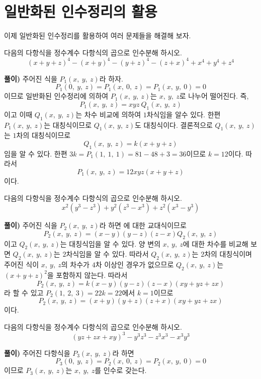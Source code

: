 \documentclass[a4paper]{article}
\begin{document}
\section{일반화된 인수정리의 활용}
이제 일반화된 인수정리를 활용하여 여러 문제들을 해결해 보자.
\vspace{1em}
\begin{problem}
 다음의 다항식을 정수계수 다항식의 곱으로 인수분해 하시오.
 \[
 (x+y+z)^4 - (x+y)^4 - (y+z)^4 - (z+x)^4 +x^4 + y^4 + z^4
 \]
\end{problem}

\textbf{풀이)} 주어진 식을 $P_{1}(x,\:y,\:z)$라 하자. 
\[
P_{1}(0, \:y,\:z) = P_{1}(x,\:0, \:z) = P_{1}(x,\:y,\:0) =0
\]
이므로 일반화된 인수정리에 의하여 $P_{1}(x,\:y,\:z)$는 $x,\:y,\:z$로 나누어 떨어진다. 즉, 
\[
P_{1}(x,\:y,\:z) = x y z \: Q_{1}(x,\: y,\:z)
\]
이고 이때 $Q_{1}(x,\: y,\:z)$는 차수 비교에 의하여 $1$차식임을 알수 있다. 한편 $P_{1}(x,\:y,\:z)$는 대칭식이므로 $Q_{1}(x,\: y,\:z)$도 대칭식이다. 결론적으로 $Q_{1}(x,\: y,\:z)$는 $1$차의 대칭식이므로 
\[
Q_{1}(x,\: y,\:z) = k(x+y+z)
\]
임을 알 수 있다. 한편 $3k=P_{1}(1,\:1,\:1)=81-48+3=36$이므로 $k=12$이다. 따라서
\[
P_{1}(x,\:y,\:z) = 12 x y z (x+y+z)
\]
이다.
\vspace{1em}

\begin{problem}
 다음의 다항식을 정수계수 다항식의 곱으로 인수분해 하시오.
 \[
 x^2(y^3-z^3)+y^2(z^3-x^3)+z^2(x^3-y^3)
 \]
\end{problem}

\textbf{풀이)} 주어진 식을 $P_{2}(x,\:y,\:z)$라 하면 에 대한 교대식이므로
\[
P_{2}(x,\:y,\:z) = (x-y)(y-z)(z-x)Q_{2}(x,\:y,\:z)
\]
이고 $Q_{2}(x,\: y,\:z)$는 대칭식임을 알 수 있다. 양 변의 $x,\:y,\:z$에 대한 차수를 비교해 보면 $Q_{2}(x,\: y,\:z)$는 $2$차식임을 알 수 있다. 따라서 $Q_{2}(x,\: y,\:z)$는 $2$차의 대칭식이며 주어진 식이 $x,\:y,\:z$의 차수가 $4$차 이상인 경우가 없으므로 $Q_{2}(x,\: y,\:z)$는 $(x+y+z)^2$을 포함하지 않는다. 따라서
\[
P_{2}(x,\:y,\:z) =k(x-y)(y-z)(z-x)(xy+yz+zx)
\]
라 할 수 있고 $P_{2}(1,\:2,\:3) = 22k=22$에서 $k=1$이므로
\[
P_{2}(x,\:y,\:z) = (x+y)(y+z)(z+x) (xy+yz+zx)
\]
이다.
\vspace{1em}
\begin{problem}
  다음의 다항식을 정수계수 다항식의 곱으로 인수분해 하시오.
  \[
  (yz+zx+xy)^3 - y^3z^3 -z^3x^3-x^3y^3
  \]
\end{problem}

\textbf{풀이)} 주어진 다항식을 $P_{3}(x,\:y,\:z)$라 하면 
\[
P_{3}(0,\:y,\:z) = P_{2}(x,\:0,\:z) = P_{2}(x,\:y,\:0)=0
\]
이므로 $P_{3}(x,\:y,\:z)$는 $x, \:y,\:z$를 인수로 갖는다.
\end{document}

